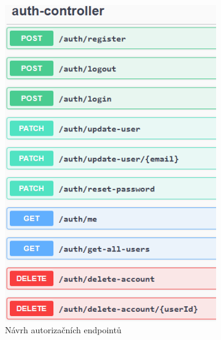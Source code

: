 \documentclass[twoside]{ctuthesis}
\begin{document}
\begin{figure}[H]
\centering
\begin{subfigure}[t]{0.49\textwidth}
  \centering
  \includegraphics[width=1.1\linewidth, height=0.6\textheight]{auth.png}
  \caption{Návrh autorizačních endpointů}
  \label{fig:authapi}
\end{subfigure}
\hfill
\begin{subfigure}[t]{0.49\textwidth}
  \centering

\end{subfigure}
\end{figure}
\end{document}

